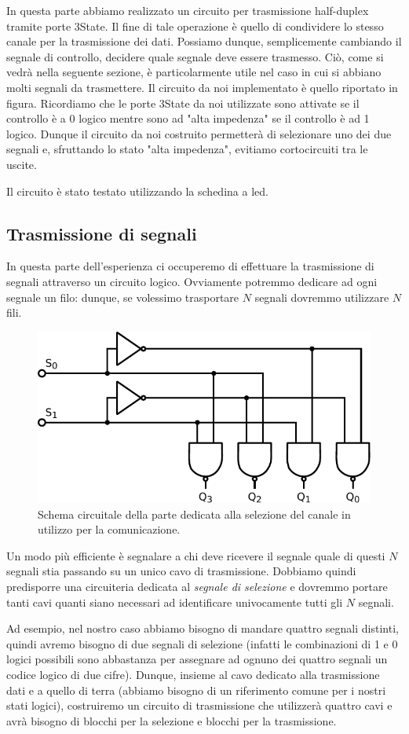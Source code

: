 In questa parte abbiamo realizzato un circuito per trasmissione half-duplex tramite porte 3State.
Il fine di tale operazione è quello di condividere lo stesso canale per la trasmissione dei dati.
Possiamo dunque, semplicemente cambiando il segnale di controllo, decidere quale segnale deve essere trasmesso.
Ciò, come si vedrà nella seguente sezione, è particolarmente utile nel caso in cui si abbiano molti segnali da trasmettere.
Il circuito da noi implementato è quello riportato in figura.
Ricordiamo che le porte 3State da noi utilizzate sono attivate se il controllo è a 0 logico mentre sono ad "alta impedenza" se il controllo è ad 1 logico.
Dunque il circuito da noi costruito permetterà di selezionare uno dei due segnali e, sfruttando lo stato "alta impedenza", evitiamo cortocircuiti tra le uscite.

Il circuito è stato testato utilizzando la schedina a led.


\subsection{Trasmissione di segnali}

In questa parte dell'esperienza ci occuperemo di effettuare la trasmissione di segnali attraverso un circuito logico.
Ovviamente potremmo dedicare ad ogni segnale un filo: dunque, se volessimo trasportare $N$ segnali dovremmo utilizzare $N$ fili.

\begin{figure}
\centering
\includegraphics[width=.38\textwidth]{../E10/latex/selector.pdf}
\caption{Schema circuitale della parte dedicata alla selezione del canale in utilizzo per la comunicazione.}
\label{cir10:selector}
\end{figure}

Un modo più efficiente è segnalare a chi deve ricevere il segnale quale di questi $N$ segnali stia passando su un unico cavo di trasmissione.
Dobbiamo quindi predisporre una circuiteria dedicata al \textit{segnale di selezione} e dovremmo portare tanti cavi quanti siano necessari ad identificare univocamente tutti gli $N$ segnali.

Ad esempio, nel nostro caso abbiamo bisogno di mandare quattro segnali distinti, quindi avremo bisogno di due segnali di selezione (infatti le combinazioni di 1 e 0 logici possibili sono abbastanza per assegnare ad ognuno dei quattro segnali un codice logico di due cifre).
Dunque, insieme al cavo dedicato alla trasmissione dati e a quello di terra (abbiamo bisogno di un riferimento comune per i nostri stati logici), costruiremo un circuito di trasmissione che utilizzerà quattro cavi e avrà bisogno di blocchi per la selezione e blocchi per la trasmissione.

